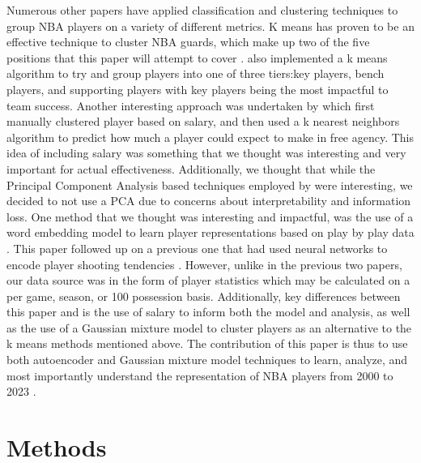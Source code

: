 \documentclass[12pt, letterpaper, titlepage]{article}
\begin{document}
Numerous other papers have applied classification and clustering techniques to group NBA players on a variety of different metrics. K means has proven to be an effective technique to cluster NBA guards, which make up two of the five positions that this paper will attempt to cover \citep{zhang2016application}.  \citet{chi3mixed} also implemented a k means algorithm to try and group players into one of three tiers:key players, bench players, and supporting players with key players being the most impactful to team success. Another interesting approach was undertaken by \citet{wu2018classification} which first manually clustered player based on salary, and then used a k nearest neighbors algorithm to predict how much a player could expect to make in free agency.  This idea of including salary was something that we thought was interesting and very important for actual effectiveness.  Additionally, we thought that while the Principal Component Analysis based techniques employed by \citet{muniz2022weighted} \citet{richardson2019evolution} were interesting, we decided to not use a PCA due to concerns about interpretability and information loss.
One method that we thought was interesting and impactful, was the use of a word embedding model to learn player representations based on play by play data \citep{guan2023nba2vec}.  This paper followed up on a previous one that had used neural networks to encode player shooting tendencies \citep{wang2016classifying}.  However, unlike in the previous two papers, our data source was in the form of player statistics which may be calculated on a per game, season, or 100 possession basis.  Additionally, key differences between this paper and \citet{guan2023nba2vec} is the use of salary to inform both the model and analysis, as well as the use of a Gaussian mixture model to cluster players as an alternative to the k means methods mentioned above. The contribution of this paper is thus to use both autoencoder and Gaussian mixture model techniques to learn, analyze, and most importantly understand the representation of  NBA players from 2000 to 2023 \citep{GMM}.


\section{Methods}
\end{document}
